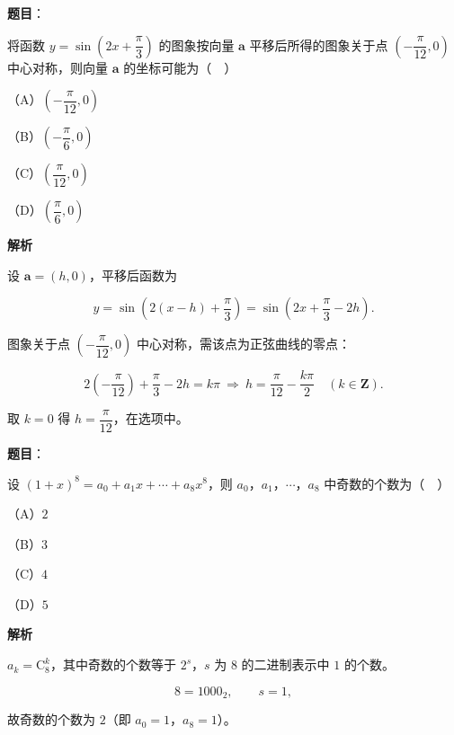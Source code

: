 \begin{answer}

\textbf{题目}：

将函数 $y=\sin\left(2x+\dfrac{\pi}{3}\right)$ 的图象按向量 $\boldsymbol a$ 平移后所得的图象关于点 $\left(-\dfrac{\pi}{12},0\right)$ 中心对称，则向量 $\boldsymbol a$ 的坐标可能为（　）

（A）$\left(-\dfrac{\pi}{12},0\right)$

（B）$\left(-\dfrac{\pi}{6},0\right)$

（C）$\left(\dfrac{\pi}{12},0\right)$

（D）$\left(\dfrac{\pi}{6},0\right)$

\textbf{解析}

设 $\boldsymbol a=(h,0)$，平移后函数为

\nopagebreak[4]
\[y=\sin\left(2(x-h)+\frac{\pi}3\right)=\sin\left(2x+\frac{\pi}3-2h\right).\]

图象关于点 $\left(-\dfrac{\pi}{12},0\right)$ 中心对称，需该点为正弦曲线的零点：

\nopagebreak[4]
\[2\left(-\frac{\pi}{12}\right)+\frac{\pi}3-2h=k\pi\ \Longrightarrow\ h=\frac{\pi}{12}-\frac{k\pi}2\quad(k\in\mathbf Z).\]

取 $k=0$ 得 $h=\dfrac{\pi}{12}$，在选项中。


\end{answer}
\begin{answer}

\textbf{题目}：

设 $(1+x)^8=a_0+a_1x+\cdots+a_8x^8$，则 $a_0$，$a_1$，$\cdots$，$a_8$ 中奇数的个数为（　）

（A）$2$

（B）$3$

（C）$4$

（D）$5$

\textbf{解析}

$a_k=\mathrm C_8^k$，其中奇数的个数等于 $2^s$，$s$ 为 $8$ 的二进制表示中 $1$ 的个数。

\nopagebreak[4]
\[8=1000_2,\qquad s=1,\]

故奇数的个数为 $2$（即 $a_0=1$，$a_8=1$）。


\end{answer}

